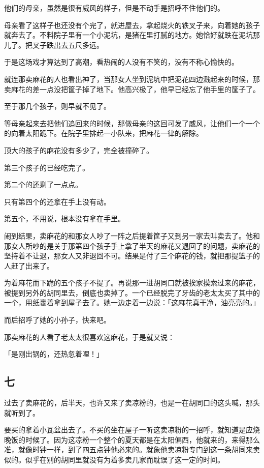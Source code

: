 \documentclass[UTF8]{ctexart}
\begin{document}
他们的母亲，虽然是很有威风的样子，但是不动手是招呼不住他们的。

母亲看了这样子也还没有个完了，就进屋去，拿起烧火的铁叉子来，向着她的孩子就奔去了。不料院子里有一个小泥坑，是猪在里打腻的地方。她恰好就跌在泥坑那儿了。把叉子跌出去五尺多远。

于是这场戏才算达到了高潮，看热闹的人没有不笑的，没有不称心愉快的。

就连那卖麻花的人也看出神了，当那女人坐到泥坑中把泥花四边溅起来的时候，那卖麻花的差一点没把筐子掉了地下。他高兴极了，他早已经忘了他手里的筐子了。

至于那几个孩子，则早就不见了。

等母亲起来去把他们追回来的时候，那做母亲的这回可发了威风，让他们一个一个的向着太阳跪下。在院子里排起一小队来，把麻花一律的解除。

顶大的孩子的麻花没有多少了，完全被撞碎了。

第三个孩子的已经吃完了。

第二个的还剩了一点点。

只有第四个的还拿在手上没有动。

第五个，不用说，根本没有拿在手里。

闹到结果，卖麻花的和那女人吵了一阵之后提着筐子又到另一家去叫卖去了。他和那女人所吵的是关于那第四个孩子手上拿了半天的麻花又退回了的问题，卖麻花的坚持着不让退，那女人又非退回不可。结果是付了三个麻花的钱，就把那提篮子的人赶了出来了。

为着麻花而下跪的五个孩子不提了。再说那一进胡同口就被挨家摸索过来的麻花，被提到另外的胡同里去，倒底也卖掉了。一个已经脱完了牙齿的老太太买了其中的一个，用纸裹着拿到屋子去了。她一边走着一边说：「这麻花真干净，油亮亮的。」

而后招呼了她的小孙子，快来吧。

那卖麻花的人看了老太太很喜欢这麻花，于是就又说：

「是刚出锅的，还热忽着哩！」

\subsection{七}

过去了卖麻花的，后半天，也许又来了卖凉粉的，也是一在胡同口的这头喊，那头就听到了。

要买的拿着小瓦盆出去了。不买的坐在屋子一听这卖凉粉的一招呼，就知道是应烧晚饭的时候了。因为这凉粉一个整个的夏天都是在太阳偏西，他就来的，来得那么准，就像时钟一样，到了四五点钟他必来的。就象他卖凉粉专门到这一条胡同来卖似的。似乎在别的胡同里就没有为着多卖几家而耽误了这一定的时间。
\end{document}
